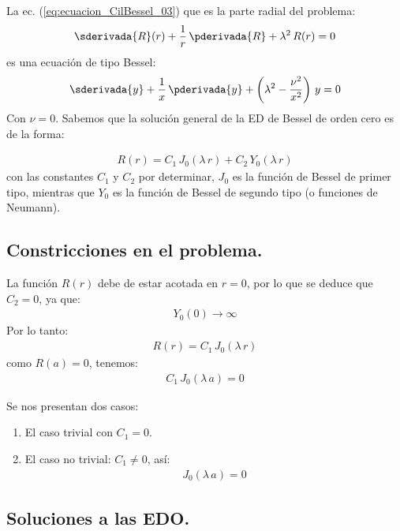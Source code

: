 La ec. (\ref{eq:ecuacion_CilBessel_03}) que es la parte radial del problema:
\begin{align*}
\sderivada{R}(r) + \dfrac{1}{r} \, \pderivada{R} + \lambda^{2} \, R(r) = 0
\end{align*}
es una ecuación de tipo Bessel:
\begin{align*}
\sderivada{y} + \dfrac{1}{x} \, \pderivada{y} + \left( \lambda^{2} - \dfrac{\nu^{2}}{x^{2}} \right) \, y = 0
\end{align*}
Con $\nu = 0$.
Sabemos que la solución general de la ED de Bessel de orden cero es de la forma:
\par
\begin{align*}
R(r) = C_{1} \, J_{0} (\lambda \, r) + C_{2} \, Y_{0} (\lambda \, r)
\end{align*}
con las constantes $C_{1}$ y $C_{2}$ por determinar, $J_{0}$ es la función de Bessel de primer tipo, mientras que $Y_{0}$ es la función de Bessel de segundo tipo (o funciones de Neumann).

\subsection{Constricciones en el problema.}

La función $R(r)$ debe de estar acotada en $r = 0$,  por lo que se deduce que $C_{2} = 0$, ya que:
\begin{align*}
Y_{0}(0) \to \infty
\end{align*}
Por lo tanto:
\begin{align*}
R(r) = C_{1} \, J_{0}(\lambda \, r)
\end{align*}
como $R(a) = 0$, tenemos:
\begin{align*}
C_{1} \, J_{0} (\lambda \, a) = 0
\end{align*}

Se nos presentan dos casos:
\begin{enumerate}[label=\alph*)]
\item El caso trivial con $C_{1} = 0$.
\item El caso no trivial: $C_{1} \neq 0$, así:
\begin{align}
J_{0} (\lambda \, a) = 0
\label{eq:ecuacion_CilBessel_05}
\end{align}
\end{enumerate}

\subsection{Soluciones a las EDO.}

